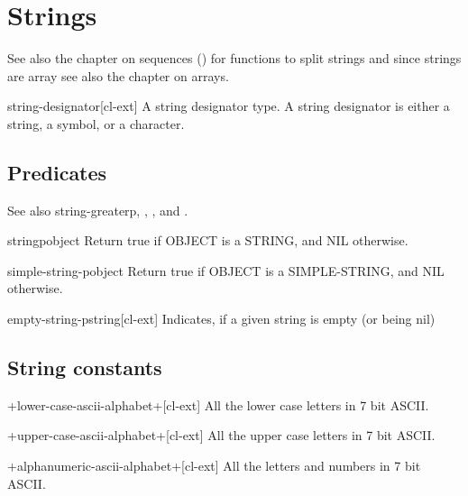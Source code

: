 \documentclass[10pt,english]{book}
\begin{document}

\chapter{Strings}
\label{cha:strings}

See also the chapter on sequences () for functions to split strings and
since strings are array see also the chapter on arrays.

\begin{type}{string-designator}{}[cl-ext]
  A string designator type. A string designator is either a string, a
  symbol, or a character.
\end{type}

\section{Predicates}
\label{sec:string-predicates}

See also string-greaterp, ,
, and .

\begin{function}{stringp}{object}
  Return true if OBJECT is a STRING, and NIL otherwise.
\end{function}

\begin{function}{simple-string-p}{object}
  Return true if OBJECT is a SIMPLE-STRING, and NIL otherwise.
\end{function}

\begin{function}{empty-string-p}{string}[cl-ext]
  Indicates, if a given string is empty (or being nil)
\end{function}

\section{String constants}
\label{sec:string-constants}

\begin{constant}{+lower-case-ascii-alphabet+}{}[cl-ext]
  All the lower case letters in 7 bit ASCII.
\end{constant}

\begin{constant}{+upper-case-ascii-alphabet+}{}[cl-ext]
  All the upper case letters in 7 bit ASCII.
\end{constant}

\begin{constant}{+alphanumeric-ascii-alphabet+}{}[cl-ext]
  All the letters and numbers in 7 bit ASCII.
\end{constant}
\end{document}
